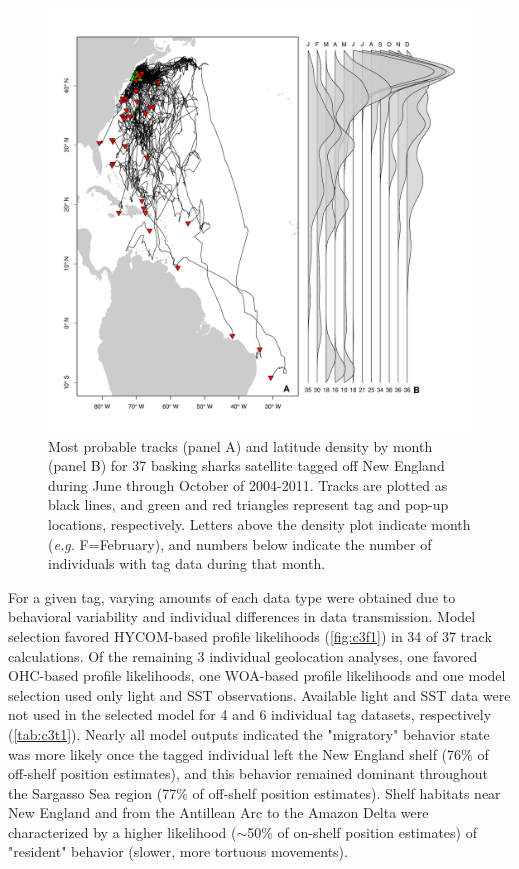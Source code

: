 \begin{figure}[t!]
\centering
\includegraphics[width=.8\textwidth]{images/C3_Fig2.pdf}
\caption[Most probable basking shark tracks]{Most probable tracks (panel A) and latitude density by month (panel B) for 37 basking sharks satellite tagged off New England during June through October of 2004-2011. Tracks are plotted as black lines, and green and red triangles represent tag and pop-up locations, respectively. Letters above the density plot indicate month (\emph{e.g.} F=February), and numbers below indicate the number of individuals with tag data during that month.}
\label{fig:c3f2}
\end{figure}

For a given tag, varying amounts of each data type were obtained due to behavioral variability and individual differences in data transmission.  Model selection favored HYCOM-based profile likelihoods (\cref{fig:c3f1}) in 34 of 37 track calculations. Of the remaining 3 individual geolocation analyses, one favored OHC-based profile likelihoods, one WOA-based profile likelihoods and one model selection used only light and SST observations. Available light and SST data were not used in the selected model for 4 and 6 individual tag datasets, respectively (\cref{tab:c3t1}). Nearly all model outputs indicated the "migratory" behavior state was more likely once the tagged individual left the New England shelf (76\% of off-shelf position estimates), and this behavior remained dominant throughout the Sargasso Sea region (77\% of off-shelf position estimates). Shelf habitats near New England and from the Antillean Arc to the Amazon Delta were characterized by a higher likelihood ($\sim$50\% of on-shelf position estimates) of "resident" behavior (\eg slower, more tortuous movements).

